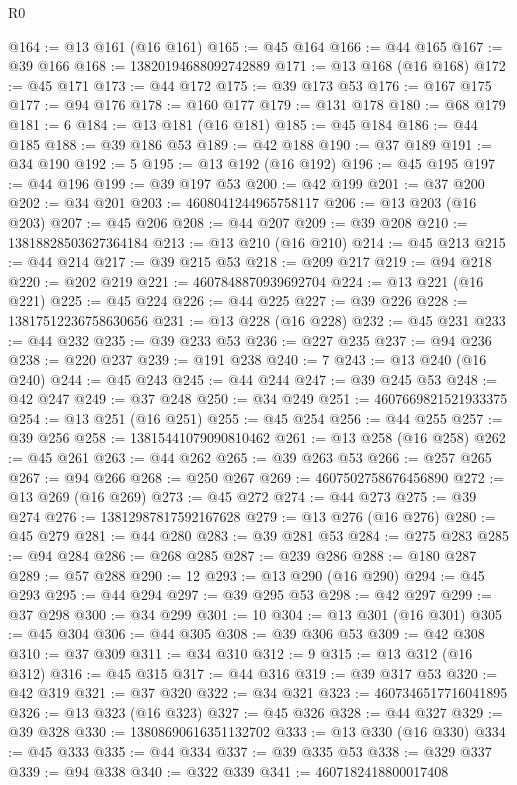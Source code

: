 \begin{lexlean}{R0}
\begin{coremodule}
@164 := @13 @161 (@16 @161)
@165 := @45 @164
@166 := @44 @165
@167 := @39 @166
@168 := 13820194688092742889
@171 := @13 @168 (@16 @168)
@172 := @45 @171
@173 := @44 @172
@175 := @39 @173 @53
@176 := @167 @175
@177 := @94 @176
@178 := @160 @177
@179 := @131 @178
@180 := @68 @179
@181 := 6
@184 := @13 @181 (@16 @181)
@185 := @45 @184
@186 := @44 @185
@188 := @39 @186 @53
@189 := @42 @188
@190 := @37 @189
@191 := @34 @190
@192 := 5
@195 := @13 @192 (@16 @192)
@196 := @45 @195
@197 := @44 @196
@199 := @39 @197 @53
@200 := @42 @199
@201 := @37 @200
@202 := @34 @201
@203 := 4608041244965758117
@206 := @13 @203 (@16 @203)
@207 := @45 @206
@208 := @44 @207
@209 := @39 @208
@210 := 13818828503627364184
@213 := @13 @210 (@16 @210)
@214 := @45 @213
@215 := @44 @214
@217 := @39 @215 @53
@218 := @209 @217
@219 := @94 @218
@220 := @202 @219
@221 := 4607848870939692704
@224 := @13 @221 (@16 @221)
@225 := @45 @224
@226 := @44 @225
@227 := @39 @226
@228 := 13817512236758630656
@231 := @13 @228 (@16 @228)
@232 := @45 @231
@233 := @44 @232
@235 := @39 @233 @53
@236 := @227 @235
@237 := @94 @236
@238 := @220 @237
@239 := @191 @238
@240 := 7
@243 := @13 @240 (@16 @240)
@244 := @45 @243
@245 := @44 @244
@247 := @39 @245 @53
@248 := @42 @247
@249 := @37 @248
@250 := @34 @249
@251 := 4607669821521933375
@254 := @13 @251 (@16 @251)
@255 := @45 @254
@256 := @44 @255
@257 := @39 @256
@258 := 13815441079090810462
@261 := @13 @258 (@16 @258)
@262 := @45 @261
@263 := @44 @262
@265 := @39 @263 @53
@266 := @257 @265
@267 := @94 @266
@268 := @250 @267
@269 := 4607502758676456890
@272 := @13 @269 (@16 @269)
@273 := @45 @272
@274 := @44 @273
@275 := @39 @274
@276 := 13812987817592167628
@279 := @13 @276 (@16 @276)
@280 := @45 @279
@281 := @44 @280
@283 := @39 @281 @53
@284 := @275 @283
@285 := @94 @284
@286 := @268 @285
@287 := @239 @286
@288 := @180 @287
@289 := @57 @288
@290 := 12
@293 := @13 @290 (@16 @290)
@294 := @45 @293
@295 := @44 @294
@297 := @39 @295 @53
@298 := @42 @297
@299 := @37 @298
@300 := @34 @299
@301 := 10
@304 := @13 @301 (@16 @301)
@305 := @45 @304
@306 := @44 @305
@308 := @39 @306 @53
@309 := @42 @308
@310 := @37 @309
@311 := @34 @310
@312 := 9
@315 := @13 @312 (@16 @312)
@316 := @45 @315
@317 := @44 @316
@319 := @39 @317 @53
@320 := @42 @319
@321 := @37 @320
@322 := @34 @321
@323 := 4607346517716041895
@326 := @13 @323 (@16 @323)
@327 := @45 @326
@328 := @44 @327
@329 := @39 @328
@330 := 13808690616351132702
@333 := @13 @330 (@16 @330)
@334 := @45 @333
@335 := @44 @334
@337 := @39 @335 @53
@338 := @329 @337
@339 := @94 @338
@340 := @322 @339
@341 := 4607182418800017408

\end{coremodule}
\end{lexlean}
